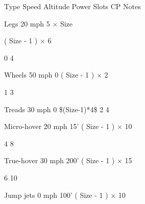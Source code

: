 \documentclass[twoside]{book}
\begin{document}
                    
                      
                       Type 
                       Speed   
                       Altitude 
                       Power   
                       Slots 
                       CP 
                       Notes   
                      
                      
                       Legs   
                       20 mph   
                             5    \ensuremath{\times}
                            Size   
                        
                             (    Size  
                          -    1    )   
                         \ensuremath{\times}    6   
                        
                       0   
                       4   
                      
                      
                       Wheels   
                       50 mph   
                       0   
                             (    Size  
                          -    1    )   
                         \ensuremath{\times}    2   
                        
                       1   
                       3   
                      
                      
                       Treads   
                       30 mph   
                       0   
                       \$(Size-1)*4\$   
                       2   
                       4   
                      
                      
                       Micro-hover   
                       20 mph   
                       15'   
                             (    Size  
                          -    1    )   
                         \ensuremath{\times}    10   
                        
                       4   
                       8   
                      
                      
                       True-hover   
                       30 mph   
                       200'   
                             (    Size  
                          -    1    )   
                         \ensuremath{\times}    15   
                        
                       6   
                       10   
                      
                      
                       Jump jets   
                       0 mph   
                       100'   
                             (    Size  
                          -    1    )   
                         \ensuremath{\times}    10   
                        
\end{document}
